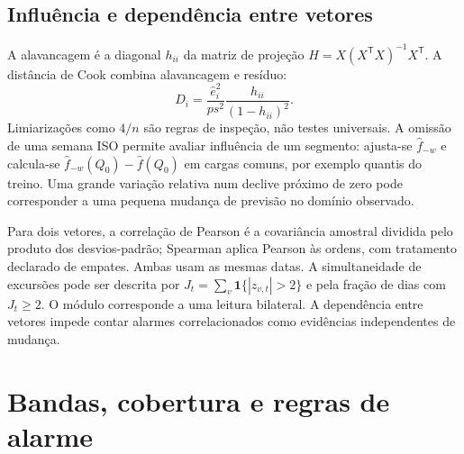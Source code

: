 \subsection{Influência e dependência entre vetores}
\label{sec:mat-influencia}
A alavancagem é a diagonal $h_{ii}$ da matriz de projeção $H=X(X^{\mathsf T}X)^{-1}X^{\mathsf T}$. A distância de Cook combina alavancagem e resíduo:
\begin{equation}
D_i=\frac{\widehat e_i^2}{p s^2}\frac{h_{ii}}{(1-h_{ii})^2}.
\label{eq:mat-cook}
\end{equation}
Limiarizações como $4/n$ são regras de inspeção, não testes universais. A omissão de uma semana ISO permite avaliar influência de um segmento: ajusta-se $\widehat f_{-w}$ e calcula-se $\widehat f_{-w}(Q_0)-\widehat f(Q_0)$ em cargas comuns, por exemplo quantis do treino. Uma grande variação relativa num declive próximo de zero pode corresponder a uma pequena mudança de previsão no domínio observado.

Para dois vetores, a correlação de Pearson é a covariância amostral dividida pelo produto dos desvios-padrão; Spearman aplica Pearson às ordens, com tratamento declarado de empates. Ambas usam as mesmas datas. A simultaneidade de excursões pode ser descrita por $J_t=\sum_v\mathbf1\{|z_{v,t}|>2\}$ e pela fração de dias com $J_t\geq2$. O módulo corresponde a uma leitura bilateral. A dependência entre vetores impede contar alarmes correlacionados como evidências independentes de mudança.



\section{Bandas, cobertura e regras de alarme}
\label{sec:mat-bandas}


